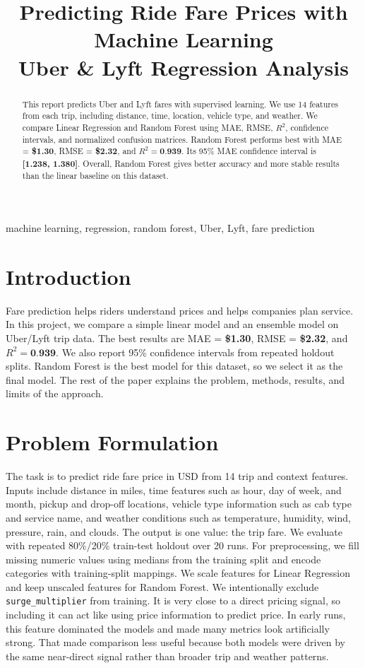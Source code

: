 \documentclass[conference]{IEEEtran}
\title{Predicting Ride Fare Prices with Machine Learning\\
\large Uber \& Lyft Regression Analysis}
\author{%
\IEEEauthorblockN{Michael DeJournett}
\IEEEauthorblockA{University of Nebraska-Lincoln\\
\texttt{mdejournett2@unl.edu}}
\and
\IEEEauthorblockN{Hugh Strumberger}
\IEEEauthorblockA{University of Nebraska-Lincoln\\
\texttt{hstrumberger2@unl.edu}}
}
\begin{document}
\maketitle

\begin{abstract}
This report predicts Uber and Lyft fares with supervised learning.
We use 14 features from each trip, including distance, time, location, vehicle type, and weather.
We compare Linear Regression and Random Forest using MAE, RMSE, $R^2$, confidence intervals, and normalized confusion matrices.
Random Forest performs best with MAE = \textbf{\$1.30}, RMSE = \textbf{\$2.32}, and $R^2=\textbf{0.939}$.
Its 95\% MAE confidence interval is \textbf{[1.238, 1.380]}.
Overall, Random Forest gives better accuracy and more stable results than the linear baseline on this dataset.
\end{abstract}

\begin{IEEEkeywords}
machine learning, regression, random forest, Uber, Lyft, fare prediction
\end{IEEEkeywords}

\section{Introduction}
Fare prediction helps riders understand prices and helps companies plan service.
In this project, we compare a simple linear model and an ensemble model on Uber/Lyft trip data.
The best results are MAE = \textbf{\$1.30}, RMSE = \textbf{\$2.32}, and $R^2=\textbf{0.939}$.
We also report 95\% confidence intervals from repeated holdout splits.
Random Forest is the best model for this dataset, so we select it as the final model.
The rest of the paper explains the problem, methods, results, and limits of the approach.

\section{Problem Formulation}
The task is to predict ride fare price in USD from 14 trip and context features.
Inputs include distance in miles, time features such as hour, day of week, and month, pickup and drop-off locations,
vehicle type information such as cab type and service name, and weather conditions such as temperature, humidity, wind, pressure, rain, and clouds.
The output is one value: the trip fare.
We evaluate with repeated 80\%/20\% train-test holdout over 20 runs.
For preprocessing, we fill missing numeric values using medians from the training split and encode categories with training-split mappings.
We scale features for Linear Regression and keep unscaled features for Random Forest.
We intentionally exclude \texttt{surge\_multiplier} from training.
It is very close to a direct pricing signal, so including it can act like using price information to predict price.
In early runs, this feature dominated the models and made many metrics look artificially strong.
That made comparison less useful because both models were driven by the same near-direct signal rather than broader trip and weather patterns.
\end{document}
